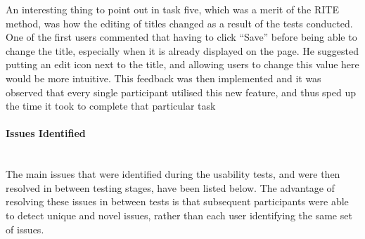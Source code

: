 \newpage
\noindent
An interesting thing to point out in task five, which was a merit of the RITE method, was how the editing of titles changed as a result of the tests conducted. One of the first users commented that having to click ``Save'' before being able to change the title, especially when it is already displayed on the page. He suggested putting an edit icon next to the title, and allowing users to change this value here would be more intuitive. This feedback was then implemented and it was observed that every single participant utilised this new feature, and thus sped up the time it took to complete that particular task

\paragraph{Issues Identified}\ \\
The main issues that were identified during the usability tests, and were then resolved in between testing stages, have been listed below. The advantage of resolving these issues in between tests is that subsequent participants were able to detect unique and novel issues, rather than each user identifying the same set of issues.
\ \\
\ \\
\noindent 

